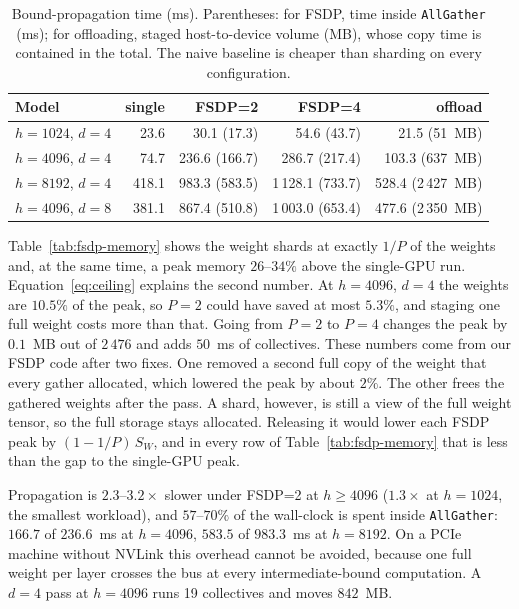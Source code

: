 \documentclass[runningheads]{llncs}
\begin{document}
\begin{table}[t]
\caption{Bound-propagation time (ms). Parentheses: for FSDP, time inside
\texttt{AllGather} (ms); for offloading, staged host-to-device volume (MB),
whose copy time is contained in the total. The naive baseline is cheaper than
sharding on every configuration.}
\label{tab:fsdp-time}
\centering
\begin{tabular}{lrrrr}
\toprule
Model & single & FSDP=2 & FSDP=4 & offload \\
\midrule
$h{=}1024$, $d{=}4$ &  23.6 &  30.1 (17.3) &  54.6 (43.7) &  21.5 (51~MB) \\
$h{=}4096$, $d{=}4$ &  74.7 & 236.6 (166.7) & 286.7 (217.4) & 103.3 (637~MB) \\
$h{=}8192$, $d{=}4$ & 418.1 & 983.3 (583.5) &1\,128.1 (733.7) & 528.4 (2\,427~MB) \\
$h{=}4096$, $d{=}8$ & 381.1 & 867.4 (510.8) &1\,003.0 (653.4) & 477.6 (2\,350~MB) \\
\bottomrule
\end{tabular}
\end{table}

Table~\ref{tab:fsdp-memory} shows the weight shards at exactly $1/P$ of the
weights and, at the same time, a peak memory $26$--$34\%$ above the single-GPU
run. Equation~\ref{eq:ceiling} explains the second number. At $h{=}4096$,
$d{=}4$ the weights are $10.5\%$ of the peak, so $P{=}2$ could have saved at
most $5.3\%$, and staging one full weight costs more than that. Going from
$P{=}2$ to $P{=}4$ changes the peak by $0.1$~MB out of $2\,476$ and adds
$50$~ms of collectives. These numbers come from our FSDP code after two fixes.
One removed a second full copy of the weight that every gather allocated, which
lowered the peak by about $2\%$. The other frees the gathered weights after the
pass. A shard, however, is still a view of the full weight tensor, so the full
storage stays allocated. Releasing it would lower each FSDP peak by
$(1-1/P)\,S_W$, and in every row of Table~\ref{tab:fsdp-memory} that is less
than the gap to the single-GPU peak.

Propagation is $2.3$--$3.2\times$ slower under FSDP=2 at $h \geq 4096$
($1.3\times$ at $h{=}1024$, the smallest workload), and $57$--$70\%$ of the
wall-clock is spent inside \texttt{AllGather}: $166.7$ of $236.6$~ms at
$h{=}4096$, $583.5$ of $983.3$~ms at $h{=}8192$. On a PCIe machine without
NVLink this overhead cannot be avoided, because one full weight per layer
crosses the bus at every intermediate-bound computation. A $d{=}4$ pass at
$h{=}4096$ runs 19 collectives and moves $842$~MB.
\end{document}
